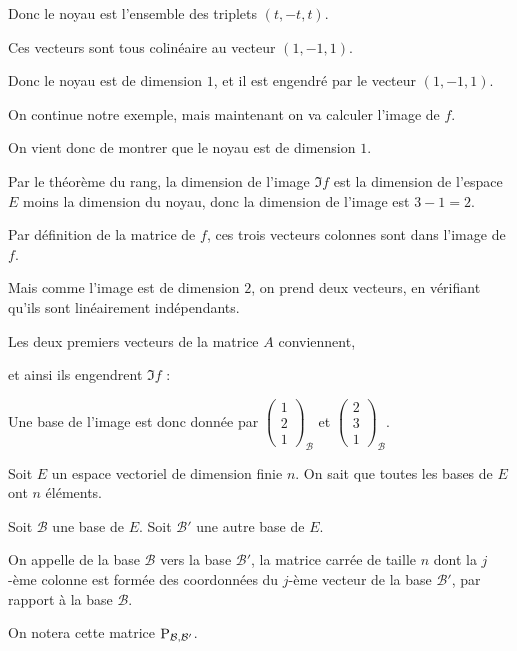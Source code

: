 Donc le noyau est l'ensemble des triplets $(t,-t,t)$.

\change
Ces vecteurs sont tous colinéaire au vecteur $(1,-1,1)$.

Donc le noyau est de dimension $1$, et il est engendré par le vecteur $(1,-1,1)$.

\diapo

On continue notre exemple, mais maintenant on va calculer l'image de $f$.

\change
On vient donc de montrer que le noyau est de dimension $1$. 

\change
Par le théorème du rang, la dimension de l'image $\Im f$ 
est la dimension de l'espace $E$ moins la dimension du noyau, donc 
la dimension de l'image est $3-1=2$.

\change
Par définition de la matrice de $f$, ces trois vecteurs colonnes
sont dans l'image de $f$.

Mais comme l'image est de dimension $2$,
on prend deux vecteurs, en vérifiant qu'ils sont linéairement indépendants.

\change
Les deux premiers vecteurs de la matrice $A$ conviennent, 

et ainsi ils engendrent $\Im f$ : 

Une base de l'image est donc donnée par 
$\left(\begin{smallmatrix}1\\2\\1\end{smallmatrix}\right)_{\mathcal{B}}$
et $\left(\begin{smallmatrix}2\\3\\1\end{smallmatrix}\right)_{\mathcal{B}}$.

\diapo


Soit $E$ un espace vectoriel de dimension finie $n$. 
On sait que toutes les bases de $E$ ont $n$ éléments.

\change
Soit $\mathcal{B}$ une base de $E$. Soit $\mathcal{B}'$ une autre base de $E$.

\change
On appelle  de la base $\mathcal{B}$ vers la base 
$\mathcal{B}'$,  la matrice carrée de taille $n$ dont la $j$-ème colonne 
est formée des coordonnées du $j$-ème vecteur de la base $\mathcal{B}'$, 
par rapport à la base $\mathcal{B}$.

On notera cette matrice $\mathop{\text{P}}\nolimits_{\mathcal{B},\mathcal{B'}}$.

